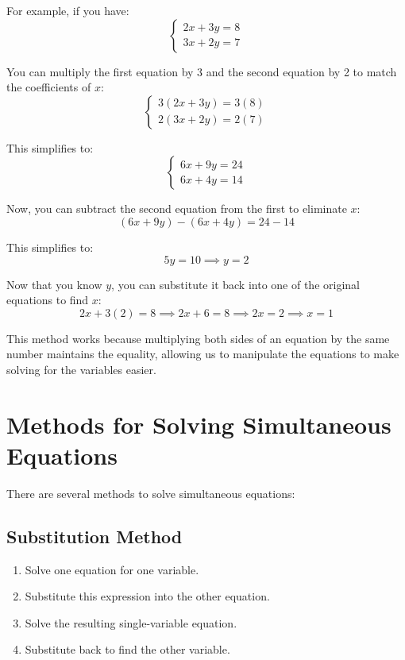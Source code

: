 \documentclass[12pt]{article}
\begin{document}
For example, if you have:
\[
\begin{cases}
2x + 3y = 8 \\
3x + 2y = 7
\end{cases}
\]

You can multiply the first equation by 3 and the second equation by 2 to match the coefficients of \( x \):
\[
\begin{cases}
3(2x + 3y) = 3(8) \\
2(3x + 2y) = 2(7)
\end{cases}
\]

This simplifies to:
\[
\begin{cases}
6x + 9y = 24 \\
6x + 4y = 14
\end{cases}
\]

Now, you can subtract the second equation from the first to eliminate \( x \):
\[
(6x + 9y) - (6x + 4y) = 24 - 14
\]

This simplifies to:
\[
5y = 10 \implies y = 2
\]

Now that you know \( y \), you can substitute it back into one of the original equations to find \( x \):
\[
2x + 3(2) = 8 \implies 2x + 6 = 8 \implies 2x = 2 \implies x = 1
\]

This method works because multiplying both sides of an equation by the same number maintains the equality, allowing us to manipulate the equations to make solving for the variables easier.

\newpage

\section*{Methods for Solving Simultaneous Equations}
There are several methods to solve simultaneous equations:

\subsection*{Substitution Method}

\begin{enumerate}
\item Solve one equation for one variable.
\item Substitute this expression into the other equation.
\item Solve the resulting single-variable equation.
\item Substitute back to find the other variable.
\end{enumerate}
\end{document}
